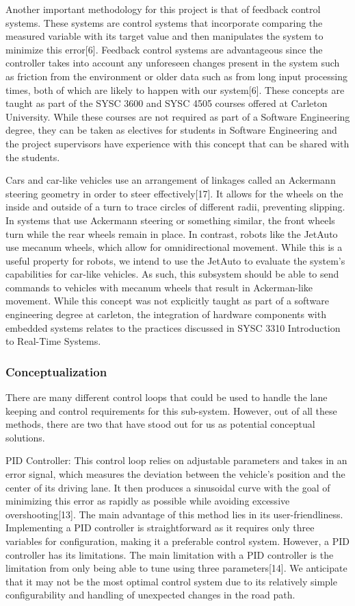 \documentclass[titlepage]{article}
\begin{document}
Another important methodology for this project is that of feedback control systems. These systems are control systems that incorporate comparing the measured variable with its target value and then manipulates the system to minimize this error[6]. Feedback control systems are advantageous since the controller takes into account any unforeseen changes present in the system such as friction from the environment or older data such as from long input processing times, both of which are likely to happen with our system[6]. These concepts are taught as part of the SYSC 3600 and SYSC 4505 courses offered at Carleton University. While these courses are not required as part of a Software Engineering degree, they can be taken as electives for students in Software Engineering and the project supervisors have experience with this concept that can be shared with the students. 

Cars and car-like vehicles use an arrangement of linkages called an Ackermann steering geometry in order to steer effectively[17]. It allows for the wheels on the inside and outside of a turn to trace circles of different radii, preventing slipping. In systems that use Ackermann steering or something similar, the front wheels turn while the rear wheels remain in place. In contrast, robots like the JetAuto use mecanum wheels, which allow for omnidirectional movement. While this is a useful property for robots, we intend to use the JetAuto to evaluate the system’s capabilities for car-like vehicles. As such, this subsystem should be able to send commands to vehicles with mecanum wheels that result in Ackerman-like movement. While this concept was not explicitly taught as part of a software engineering degree at carleton, the integration of hardware components with embedded systems relates to the practices discussed in SYSC 3310 Introduction to Real-Time Systems. 

\subsubsection{Conceptualization}

There are many different control loops that could be used to handle the lane keeping and control requirements for this sub-system. However, out of all these methods, there are two that have stood out for us as potential conceptual solutions.

PID Controller:
This control loop relies on adjustable parameters and takes in an error signal, which measures the deviation between the vehicle's position and the center of its driving lane. It then produces a sinusoidal curve with the goal of minimizing this error as rapidly as possible while avoiding excessive overshooting[13]. The main advantage of this method lies in its user-friendliness. Implementing a PID controller is straightforward as it requires only three variables for configuration, making it a preferable control system. However, a PID controller has its limitations. The main limitation with a PID controller is the limitation from only being able to tune using three parameters[14]. We anticipate that it may not be the most optimal control system due to its relatively simple configurability and handling of unexpected changes in the road path.
\end{document}
